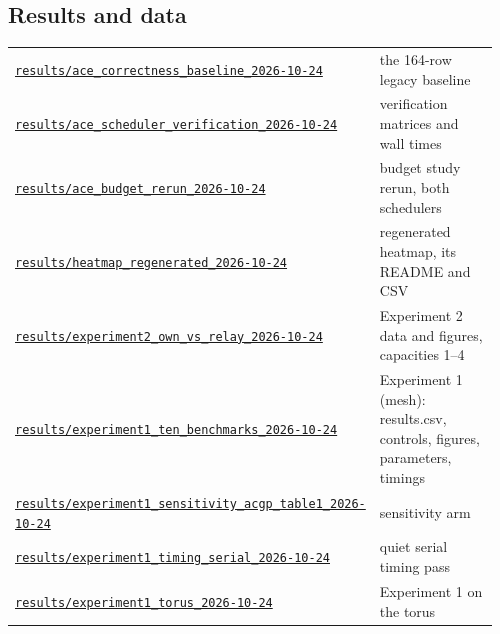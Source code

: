 {\subsection*{Results and data}
\begin{longtable}{@{}p{0.60\linewidth}p{0.36\linewidth}@{}}
\href{https://github.com/sanjeevkrishnaa/Compiler-Driven-ACE/tree/codex/ace-scheduler-correctness/results/ace_correctness_baseline_2026-10-24}{\nolinkurl{results/ace_correctness_baseline_2026-10-24}} & the 164-row legacy baseline \\
\href{https://github.com/sanjeevkrishnaa/Compiler-Driven-ACE/tree/codex/ace-scheduler-correctness/results/ace_scheduler_verification_2026-10-24}{\nolinkurl{results/ace_scheduler_verification_2026-10-24}} & verification matrices and wall times \\
\href{https://github.com/sanjeevkrishnaa/Compiler-Driven-ACE/tree/codex/ace-scheduler-correctness/results/ace_budget_rerun_2026-10-24}{\nolinkurl{results/ace_budget_rerun_2026-10-24}} & budget study rerun, both schedulers \\
\href{https://github.com/sanjeevkrishnaa/Compiler-Driven-ACE/tree/codex/ace-scheduler-correctness/results/heatmap_regenerated_2026-10-24}{\nolinkurl{results/heatmap_regenerated_2026-10-24}} & regenerated heatmap, its README and CSV \\
\href{https://github.com/sanjeevkrishnaa/Compiler-Driven-ACE/tree/codex/ace-scheduler-correctness/results/experiment2_own_vs_relay_2026-10-24}{\nolinkurl{results/experiment2_own_vs_relay_2026-10-24}} & Experiment 2 data and figures, capacities 1–4 \\
\href{https://github.com/sanjeevkrishnaa/Compiler-Driven-ACE/tree/codex/ace-scheduler-correctness/results/experiment1_ten_benchmarks_2026-10-24}{\nolinkurl{results/experiment1_ten_benchmarks_2026-10-24}} & Experiment 1 (mesh): results.csv, controls, figures, parameters, timings \\
\href{https://github.com/sanjeevkrishnaa/Compiler-Driven-ACE/tree/codex/ace-scheduler-correctness/results/experiment1_sensitivity_acgp_table1_2026-10-24}{\nolinkurl{results/experiment1_sensitivity_acgp_table1_2026-10-24}} & sensitivity arm \\
\href{https://github.com/sanjeevkrishnaa/Compiler-Driven-ACE/tree/codex/ace-scheduler-correctness/results/experiment1_timing_serial_2026-10-24}{\nolinkurl{results/experiment1_timing_serial_2026-10-24}} & quiet serial timing pass \\
\href{https://github.com/sanjeevkrishnaa/Compiler-Driven-ACE/tree/codex/ace-scheduler-correctness/results/experiment1_torus_2026-10-24}{\nolinkurl{results/experiment1_torus_2026-10-24}} & Experiment 1 on the torus \\

\end{longtable}}
